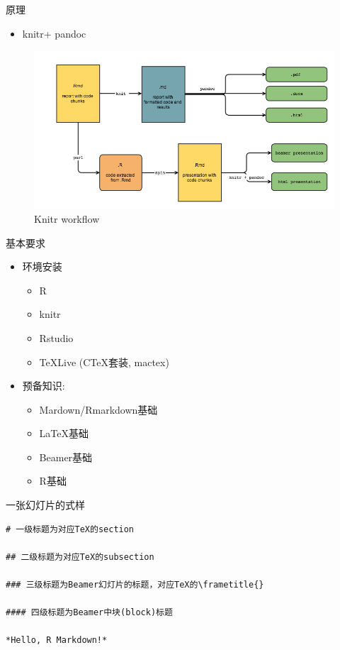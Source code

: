 \documentclass[
  12pt,
  ignorenonframetext,
  aspectratio=169, 12pt,table,t,utf-8]{beamer}
\providecommand{\tightlist}{%
  \setlength{\itemsep}{0pt}\setlength{\parskip}{0pt}}
\begin{document}
\begin{frame}{原理}
\protect\hypertarget{ux539fux7406}{}
\begin{itemize}
\tightlist
\item
  knitr+ pandoc
\end{itemize}

\begin{figure}[h]

{\centering \includegraphics[width=0.65\linewidth]{./figures/knitr-workflow} 

}

\caption{Knitr workflow}\label{fig:unnamed-chunk-2}
\end{figure}
\end{frame}

\begin{frame}{基本要求}
\protect\hypertarget{ux57faux672cux8981ux6c42}{}
\begin{itemize}
\tightlist
\item
  环境安装

  \begin{itemize}
  \tightlist
  \item
    R
  \item
    knitr
  \item
    Rstudio
  \item
    \TeX{}Live (C\TeX{}套装, mactex)
  \end{itemize}
\item
  预备知识:

  \begin{itemize}
  \tightlist
  \item
    Mardown/Rmarkdown基础
  \item
    \LaTeX{}基础
  \item
    Beamer基础
  \item
    R基础
  \end{itemize}
\end{itemize}
\end{frame}

\begin{frame}[fragile]{一张幻灯片的式样}
\protect\hypertarget{ux4e00ux5f20ux5e7bux706fux7247ux7684ux5f0fux6837}{}
\begin{verbatim}
# 一级标题为对应TeX的section

## 二级标题为对应TeX的subsection

### 三级标题为Beamer幻灯片的标题，对应TeX的\frametitle{}

#### 四级标题为Beamer中块(block)标题

*Hello, R Markdown!*
\end{verbatim}
\end{frame}
\end{document}
